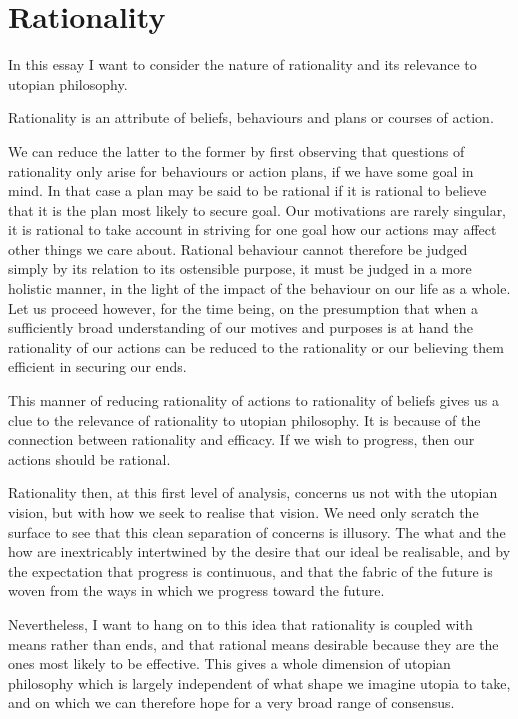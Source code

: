 \chapter{Rationality}\label{Rationality}

In this essay I want to consider the nature of rationality and its relevance to utopian philosophy.

Rationality is an attribute of beliefs, behaviours and plans or courses of action.

We can reduce the latter to the former by first observing that questions of rationality only arise for behaviours or action plans, if we have some goal in mind.
In that case a plan may be said to be rational if it is rational to believe that it is the plan most likely to secure goal.
Our motivations are rarely singular, it is rational to take account in striving for one goal how our actions may affect other things we care about.
Rational behaviour cannot therefore be judged simply by its relation to its ostensible purpose, it must be judged in a more holistic manner, in the light of the impact of the behaviour on our life as a whole.
Let us proceed however, for the time being, on the presumption that when a sufficiently broad understanding of our motives and purposes is at hand the rationality of our actions can be reduced to the rationality or our believing them efficient in securing our ends.

This manner of reducing rationality of actions to rationality of beliefs gives us a clue to the relevance of rationality to utopian philosophy.
It is because of the connection between rationality and efficacy.
If we wish to progress, then our actions should be rational.

Rationality then, at this first level of analysis, concerns us not with the utopian vision, but with how we seek to realise that vision.
We need only scratch the surface to see that this clean separation of concerns is illusory.
The what and the how are inextricably intertwined by the desire that our ideal be realisable, and by the expectation that progress is continuous, and that the fabric of the future is woven from the ways in which we progress toward the future.

Nevertheless, I want to hang on to this idea that rationality is coupled with means rather than ends, and that rational means desirable because they are the ones most likely to be effective.
This gives a whole dimension of utopian philosophy which is largely independent of what shape we imagine utopia to take, and on which we can therefore hope for a very broad range of consensus.

